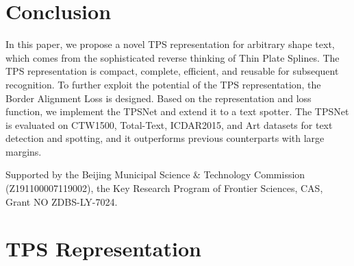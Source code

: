 \documentclass[sigconf]{acmart}
\begin{document}
	\section{Conclusion}
	In this paper, we propose a novel TPS representation for arbitrary shape text, which comes from the sophisticated reverse thinking of Thin Plate Splines. The TPS representation is compact, complete, efficient, and reusable for subsequent recognition. To further exploit the potential of the TPS representation, the Border Alignment Loss is designed. Based on the representation and loss function, we implement the TPSNet and extend it to a text spotter. The TPSNet is evaluated on CTW1500, Total-Text, ICDAR2015, and Art datasets for text detection and spotting, and it outperforms previous counterparts with large margins.
\begin{acks}
		Supported by the Beijing Municipal Science \& Technology Commission (Z191100007119002), the Key Research Program of Frontier Sciences, CAS, Grant NO ZDBS-LY-7024.
	\end{acks}
	

	\balance
	
	
	
\newpage
	\appendix
	\section{TPS Representation}
\end{document}
